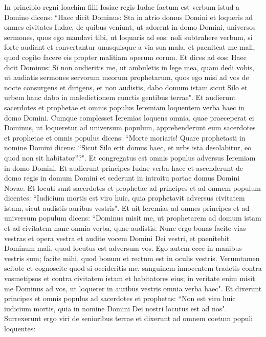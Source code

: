 \begin{biblechapter}  
\verse In principio regni Ioachim filii Iosiae regis Iudae factum est verbum istud a Domino dicens: 
\verse “Haec dicit Dominus: Sta in atrio domus Domini et loqueris ad omnes civitates Iudae, de quibus veniunt, ut adorent in domo Domini, universos sermones, quos ego mandavi tibi, ut loquaris ad eos: noli subtrahere verbum, 
\verse si forte audiant et convertantur unusquisque a via sua mala, et paeniteat me mali, quod cogito facere eis propter malitiam operum eorum. 
\verse Et dices ad eos: Haec dicit Dominus: Si non audieritis me, ut ambuletis in lege mea, quam dedi vobis, 
\verse ut audiatis sermones servorum meorum prophetarum, quos ego misi ad vos de nocte consurgens et dirigens, et non audistis, 
\verse dabo domum istam sicut Silo et urbem hanc dabo in maledictionem cunctis gentibus terrae". 
\verse Et audierunt sacerdotes et prophetae et omnis populus Ieremiam loquentem verba haec in domo Domini. 
\verse Cumque complesset Ieremias loquens omnia, quae praeceperat ei Dominus, ut loqueretur ad universum populum, apprehenderunt eum sacerdotes et prophetae et omnis populus dicens: “Morte moriaris! 
\verse Quare prophetasti in nomine Domini dicens: “Sicut Silo erit domus haec, et urbs ista desolabitur, eo quod non sit habitator”?". Et congregatus est omnis populus adversus Ieremiam in domo Domini. 
\verse Et audierunt principes Iudae verba haec et ascenderunt de domo regis in domum Domini et sederunt in introitu portae domus Domini Novae. 
\verse Et locuti sunt sacerdotes et prophetae ad principes et ad omnem populum dicentes: “Iudicium mortis est viro huic, quia prophetavit adversus civitatem istam, sicut audistis auribus vestris". 
\verse Et ait Ieremias ad omnes principes et ad universum populum dicens: “Dominus misit me, ut prophetarem ad domum istam et ad civitatem hanc omnia verba, quae audistis. 
\verse Nunc ergo bonas facite vias vestras et opera vestra et audite vocem Domini Dei vestri, et paenitebit Dominum mali, quod locutus est adversum vos. 
\verse Ego autem ecce in manibus vestris sum; facite mihi, quod bonum et rectum est in oculis vestris. 
\verse Verumtamen scitote et cognoscite quod si occideritis me, sanguinem innocentem tradetis contra vosmetipsos et contra civitatem istam et habitatores eius; in veritate enim misit me Dominus ad vos, ut loquerer in auribus vestris omnia verba haec".  
\verse Et dixerunt principes et omnis populus ad sacerdotes et prophetas: “Non est viro huic iudicium mortis, quia in nomine Domini Dei nostri locutus est ad nos". 
\verse Surrexerunt ergo viri de senioribus terrae et dixerunt ad omnem coetum populi loquentes: 

\end{biblechapter}
